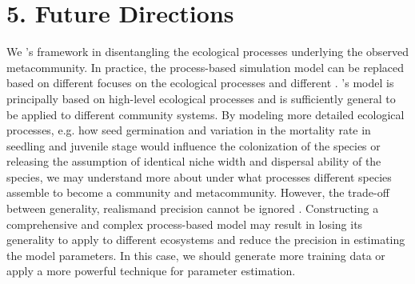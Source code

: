 \chapter*{5. Future Directions}
\setcounter{chapter}{5}
\noindent
We \DIFdelbegin {}\DIFdelend \DIFaddbegin {}\DIFaddend \citeauthor{guzman2022accounting}'s framework in disentangling the ecological processes underlying the observed metacommunity. In practice, the process-based simulation model can be \DIFaddbegin {}\DIFaddend replaced based on different focuses on the ecological processes and different \DIFdelbegin {}\DIFdelend \DIFaddbegin {}\DIFaddend . \citeauthor{thompson2020process}'s model is principally based on high-level ecological processes and is sufficiently general to be applied to different community systems. By modeling more detailed ecological processes, e.g. how seed germination and variation in the mortality rate in seedling and juvenile stage would influence the colonization of the species or releasing the assumption of identical niche width and dispersal ability of the species, we may understand more about under what processes \DIFdelbegin \DIFdel{, }\DIFdelend \DIFaddbegin {}\DIFaddend different species assemble to become a community and metacommunity. However, the trade-off between generality, realism\DIFaddbegin \DIFadd{, }\DIFaddend and precision cannot be ignored \citep{levins1966strategy}. Constructing a comprehensive and complex process-based model may result in losing its generality to apply to different ecosystems and reduce the precision in estimating the model parameters. In this case, we should generate more training data or apply a more powerful technique for parameter estimation. \DIFaddbegin {}\DIFaddend 

